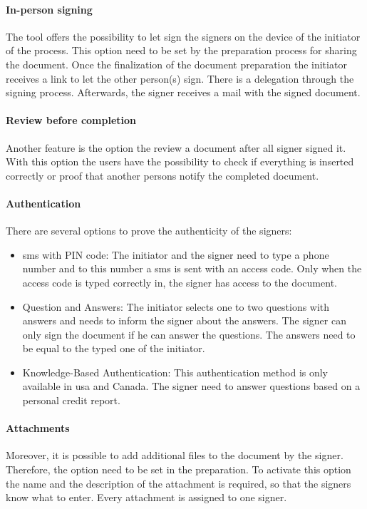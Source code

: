\paragraph{In-person signing}
The tool offers the possibility to let sign the signers on the device of the initiator of the process. This option need to be set by the preparation process for sharing the document. Once the finalization of the document preparation the initiator receives a link to let the other person(s) sign. There is a delegation through the signing process. Afterwards, the signer receives a mail with the signed document.

\paragraph{Review before completion}
Another feature is the option the review a document after all signer signed it. With this option the users have the possibility to check if everything is inserted correctly or proof that another persons notify the completed document. 

\paragraph{Authentication}
There are several options to prove the authenticity of the signers:
\begin{itemize}
	\item \gls{sms} with PIN code: The initiator and the signer need to type a phone number and to this number a \gls{sms} is sent with an access code. Only when the access code is typed correctly in, the signer has access to the document.
	\item Question and Answers: The initiator selects one to two questions with answers and needs to inform the signer about the answers. The signer can only sign the document if he can answer the questions. The answers need to be equal to the typed one of the initiator.
	\item Knowledge-Based Authentication: This authentication method is only available in \gls{usa} and Canada. The signer need to answer questions based on a personal credit report.
\end{itemize}

\paragraph{Attachments}
Moreover, it is possible to add additional files to the document by the signer. Therefore, the option need to be set in the preparation. To activate this option the name and the description of the attachment is required, so that the signers know what to enter. Every attachment is assigned to one signer.

